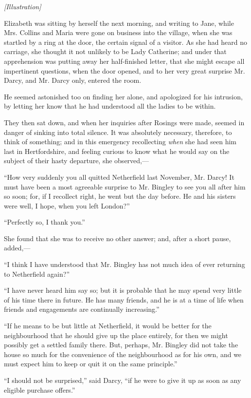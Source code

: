 \documentclass[12pt]{book}
\begin{document}
\emph{[Illustration]}

Elizabeth was sitting by herself the next morning, and writing to Jane, while Mrs. Collins and Maria were gone on business into the village, when she was startled by a ring at the door, the certain signal of a visitor. As she had heard no carriage, she thought it not unlikely to be Lady Catherine; and under that apprehension was putting away her half-finished letter, that she might escape all impertinent questions, when the door opened, and to her very great surprise Mr. Darcy, and Mr. Darcy only, entered the room.

He seemed astonished too on finding her alone, and apologized for his intrusion, by letting her know that he had understood all the ladies to be within.

They then sat down, and when her inquiries after Rosings were made, seemed in danger of sinking into total silence. It was absolutely necessary, therefore, to think of something; and in this emergency recollecting \textit{when} she had seen him last in Hertfordshire, and feeling curious to know what he would say on the subject of their hasty departure, she observed,---

``How very suddenly you all quitted Netherfield last November, Mr. Darcy! It must have been a most agreeable surprise to Mr. Bingley to see you all after him so soon; for, if I recollect right, he went but the day before. He and his sisters were well, I hope, when you left London?''

``Perfectly so, I thank you.''

She found that she was to receive no other answer; and, after a short pause, added,---

``I think I have understood that Mr. Bingley has not much idea of ever returning to Netherfield again?''

``I have never heard him say so; but it is probable that he may spend very little of his time there in future. He has many friends, and he is at a time of life when friends and engagements are continually increasing.''

``If he means to be but little at Netherfield, it would be better for the neighbourhood that he should give up the place entirely, for then we might possibly get a settled family there. But, perhaps, Mr. Bingley did not take the house so much for the convenience of the neighbourhood as for his own, and we must expect him to keep or quit it on the same principle.''

``I should not be surprised,'' said Darcy, ``if he were to give it up as soon as any eligible purchase offers.''
\end{document}
